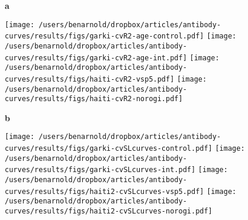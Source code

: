 \documentclass[11pt]{article}
\begin{document}
\clearpage
\begin{landscape}

\begin{figure}[htbp]
{\Large \textbf{a}}
\vspace{-10pt}
\begin{center}
\texttt{[image: /users/benarnold/dropbox/articles/antibody-curves/results/figs/garki-cvR2-age-control.pdf]}
\texttt{[image: /users/benarnold/dropbox/articles/antibody-curves/results/figs/garki-cvR2-age-int.pdf]}
\texttt{[image: /users/benarnold/dropbox/articles/antibody-curves/results/figs/haiti-cvR2-vsp5.pdf]}
\texttt{[image: /users/benarnold/dropbox/articles/antibody-curves/results/figs/haiti-cvR2-norogi.pdf]}\\
\end{center}
{\Large \textbf{b}}
\vspace{-10pt}
\begin{center}
\texttt{[image: /users/benarnold/dropbox/articles/antibody-curves/results/figs/garki-cvSLcurves-control.pdf]}
\texttt{[image: /users/benarnold/dropbox/articles/antibody-curves/results/figs/garki-cvSLcurves-int.pdf]}
\texttt{[image: /users/benarnold/dropbox/articles/antibody-curves/results/figs/haiti2-cvSLcurves-vsp5.pdf]}
\texttt{[image: /users/benarnold/dropbox/articles/antibody-curves/results/figs/haiti2-cvSLcurves-norogi.pdf]}


\end{center}
\end{figure}
\end{landscape}
\end{document}
